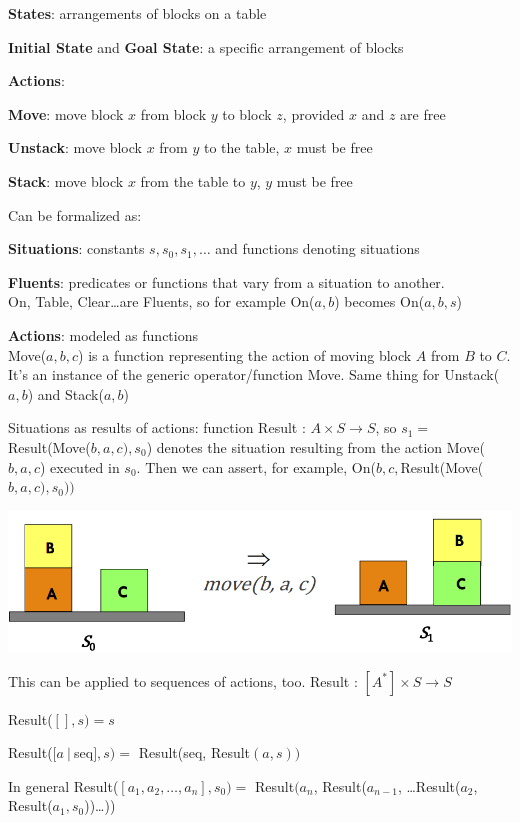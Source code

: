 \documentclass[10pt]{report}
\begin{document}
\begin{list}{}{}
	\item \textbf{States}: arrangements of blocks on a table
	\item \textbf{Initial State} and \textbf{Goal State}: a specific arrangement of blocks
	\item \textbf{Actions}:
	\begin{list}{}{}
		\item \textbf{Move}: move block $x$ from block $y$ to block $z$, provided $x$ and $z$ are free
		\item \textbf{Unstack}: move block $x$ from $y$ to the table, $x$ must be free
		\item \textbf{Stack}: move block $x$ from the table to $y$, $y$ must be free
	\end{list}
\end{list}
Can be formalized as:
\begin{list}{}{}
	\item \textbf{Situations}: constants $s,s_0,s_1,\ldots$ and functions denoting situations
	\item \textbf{Fluents}: predicates or functions that vary from a situation to another.\\
	On, Table, Clear\ldots are Fluents, so for example On($a,b$) becomes On($a,b,s$)
	\item \textbf{Actions}: modeled as functions\\
	Move($a,b,c$) is a function representing the action of moving block $A$ from $B$ to $C$. It's an instance of the generic operator/function Move. Same thing for Unstack($a,b$) and Stack($a,b$)
\end{list}
Situations as results of actions: function Result : $A\times S\rightarrow S$, so $s_1 =$ Result(Move($b,a,c),s_0$) denotes the situation resulting from the action Move($b,a,c$) executed in $s_0$. Then we can assert, for example, On($b,c,$Result(Move($b,a,c),s_0))$
\begin{center}
	\includegraphics[scale=0.5]{14.png}
\end{center}
This can be applied to sequences of actions, too. Result : $[A^*]\times S \rightarrow S$
\begin{list}{}{}
	\item Result($[],s)=s$
	\item Result($[a\:|\:$seq$],s) =$ Result(seq, Result$(a,s))$
\end{list}
In general Result($[a_1,a_2,\ldots,a_n],s_0) =$ Result$(a_n$, Result($a_{n-1}$, \ldots Result($a_2$, Result($a_1, s_0$))\ldots))
\end{document}
